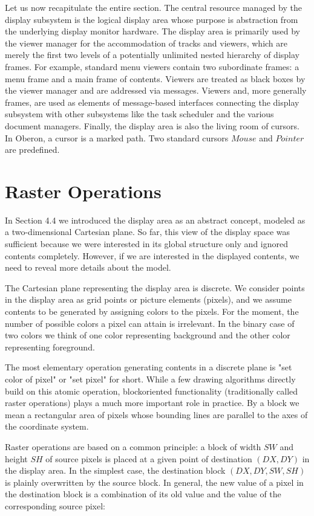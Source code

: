 Let us now recapitulate the entire section. The central resource managed by the display
subsystem is the logical display area whose purpose is abstraction from the underlying display
monitor hardware. The display area is primarily used by the viewer manager for the
accommodation of tracks and viewers, which are merely the first two levels of a potentially
unlimited nested hierarchy of display frames. For example, standard menu viewers contain two
subordinate frames: a menu frame and a main frame of contents. Viewers are treated as black
boxes by the viewer manager and are addressed via messages. Viewers and, more generally
frames, are used as elements of message-based interfaces connecting the display subsystem
with other subsystems like the task scheduler and the various document managers. Finally, the
display area is also the living room of cursors. In Oberon, a cursor is a marked path. Two standard
cursors $Mouse$ and $Pointer$ are predefined.

\section{Raster Operations}
In Section 4.4 we introduced the display area as an abstract concept, modeled as a two-dimensional Cartesian plane. So far, this view of the display space was sufficient because we
were interested in its global structure only and ignored contents completely. However, if we are
interested in the displayed contents, we need to reveal more details about the model.

The Cartesian plane representing the display area is discrete. We consider points in the display
area as grid points or picture elements (pixels), and we assume contents to be generated by
assigning colors to the pixels. For the moment, the number of possible colors a pixel can attain is
irrelevant. In the binary case of two colors we think of one color representing background and the
other color representing foreground.

The most elementary operation generating contents in a discrete plane is "set color of pixel" or
"set pixel" for short. While a few drawing algorithms directly build on this atomic operation, blockoriented functionality (traditionally called raster operations) plays a much more important role in
practice. By a block we mean a rectangular area of pixels whose bounding lines are parallel to the
axes of the coordinate system.

Raster operations are based on a common principle: a block of width $SW$ and height $SH$ of source
pixels is placed at a given point of destination $(DX, DY)$ in the display area. In the simplest case,
the destination block $(DX, DY, SW, SH)$ is plainly overwritten by the source block. In general, the
new value of a pixel in the destination block is a combination of its old value and the value of the
corresponding source pixel:

